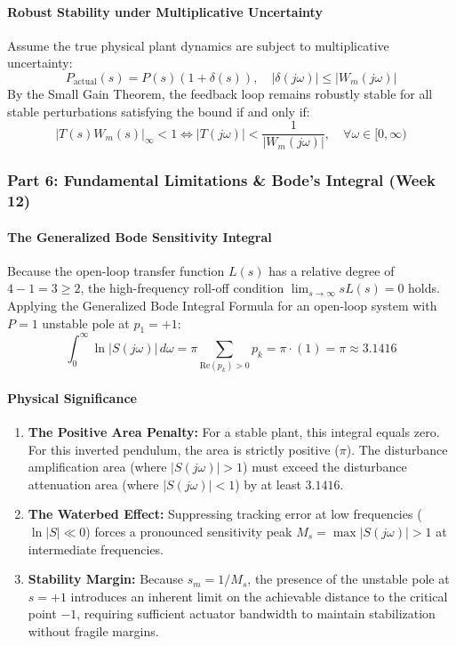 \documentclass[12pt,onecolumn,twoside ]{article}
\begin{document}
	\paragraph{Robust Stability under Multiplicative Uncertainty}
	Assume the true physical plant dynamics are subject to multiplicative uncertainty: \[
	P_{\text{actual}}(s) = P(s)(1 + \delta(s)), \quad |\delta(j\omega)| \le |W_m(j\omega)|
	\]
	By the Small Gain Theorem, the feedback loop remains robustly stable for all stable perturbations satisfying the bound if and only if: \[
	|T(s) W_m(s)|_\infty < 1 \iff |T(j\omega)| < \frac{1}{|W_m(j\omega)|}, \quad \forall \omega \in [0, \infty)
	\]
	
	\subsubsection{Part 6: Fundamental Limitations \& Bode's Integral (Week 12)}
	\paragraph{The Generalized Bode Sensitivity Integral}
	Because the open-loop transfer function $L(s)$ has a relative degree of $4 - 1 = 3 \ge 2$, the high-frequency roll-off condition $\lim_{s \to \infty} s L(s) = 0$ holds. Applying the Generalized Bode Integral Formula for an open-loop system with $P = 1$ unstable pole at $p_1 = +1$:
	\[
	\int_{0}^{\infty} \ln |S(j\omega)|\, d\omega = \pi \sum_{\text{Re}(p_k) > 0} p_k = \pi \cdot (1) = \pi \approx 3.1416
	\]
	\paragraph{Physical Significance}
	\begin{enumerate}
		\item
		\textbf{The Positive Area Penalty:} For a stable plant, this integral equals zero. For this inverted pendulum, the area is strictly positive ($\pi$). The disturbance amplification area (where $|S(j\omega)| > 1$) must exceed the disturbance attenuation area (where $|S(j\omega)| < 1$) by at least $3.1416$.
		\item
		\textbf{The Waterbed Effect:} Suppressing tracking error at low frequencies ($\ln |S| \ll 0$) forces a pronounced sensitivity peak $M_s = \max |S(j\omega)| > 1$ at intermediate frequencies.
		\item
		\textbf{Stability Margin:} Because $s_m = 1/M_s$, the presence of the unstable pole at $s = +1$ introduces an inherent limit on the achievable distance to the critical point $-1$, requiring sufficient actuator bandwidth to maintain stabilization without fragile margins.
	\end{enumerate}
	
\end{document}
